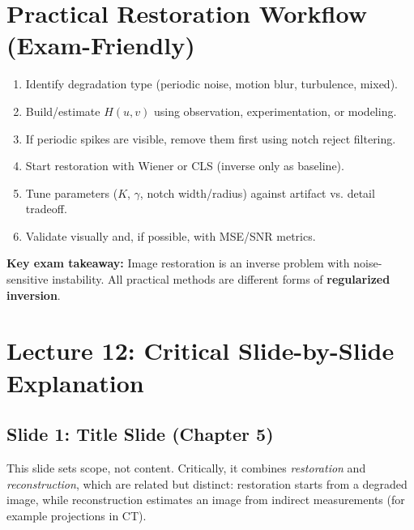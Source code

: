 \documentclass[12pt,a4paper]{article}
\begin{document}
\section{Practical Restoration Workflow (Exam-Friendly)}

\begin{enumerate}
    \item Identify degradation type (periodic noise, motion blur, turbulence, mixed).
    \item Build/estimate $H(u,v)$ using observation, experimentation, or modeling.
    \item If periodic spikes are visible, remove them first using notch reject filtering.
    \item Start restoration with Wiener or CLS (inverse only as baseline).
    \item Tune parameters ($K$, $\gamma$, notch width/radius) against artifact vs. detail tradeoff.
    \item Validate visually and, if possible, with MSE/SNR metrics.
\end{enumerate}

\begin{importantbox}
\textbf{Key exam takeaway:}
Image restoration is an inverse problem with noise-sensitive instability. All practical methods are different forms of \textbf{regularized inversion}.
\end{importantbox}

\section{Lecture 12: Critical Slide-by-Slide Explanation}

\subsection{Slide 1: Title Slide (Chapter 5)}
This slide sets scope, not content. Critically, it combines \textit{restoration} and \textit{reconstruction}, which are related but distinct: restoration starts from a degraded image, while reconstruction estimates an image from indirect measurements (for example projections in CT).
\end{document}

